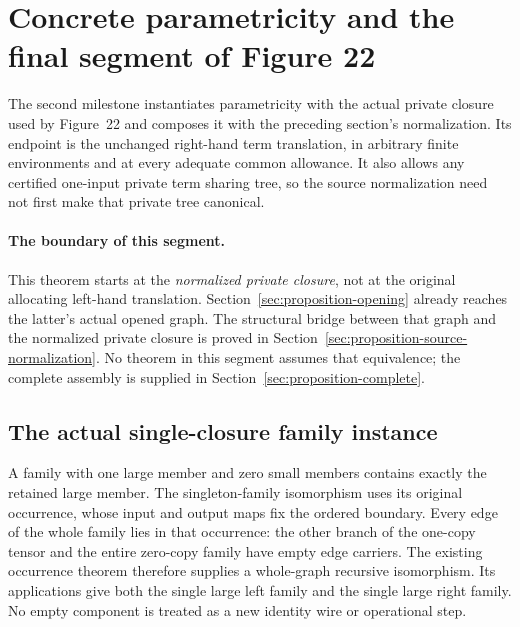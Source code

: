 \clearpage
\section{Concrete parametricity and the final segment of Figure 22}
\label{sec:proposition-final-segment}
The second milestone instantiates parametricity with the actual private
closure used by Figure~22 and composes it with the preceding section's
normalization. Its endpoint is the unchanged right-hand term translation,
in arbitrary finite environments and at every adequate common allowance.
It also allows any certified one-input private term sharing tree, so the
source normalization need not first make that private tree canonical.

\paragraph{The boundary of this segment.}
This theorem starts at the \emph{normalized private closure}, not at the
original allocating left-hand translation. Section~\ref{sec:proposition-opening}
already reaches the latter's actual opened graph. The structural bridge
between that graph and the normalized private closure is proved in
Section~\ref{sec:proposition-source-normalization}.
No theorem in this segment assumes that equivalence; the complete assembly
is supplied in Section~\ref{sec:proposition-complete}.

\subsection{The actual single-closure family instance}
A family with one large member and zero small members contains exactly the
retained large member. The singleton-family isomorphism uses its original
occurrence, whose input and output maps fix the ordered boundary. Every
edge of the whole family lies in that occurrence: the other branch of the
one-copy tensor and the entire zero-copy family have empty edge carriers.
The existing occurrence theorem therefore supplies a whole-graph recursive
isomorphism. Its applications give both the single large left family and
the single large right family. No empty component is treated as a new
identity wire or operational step.

